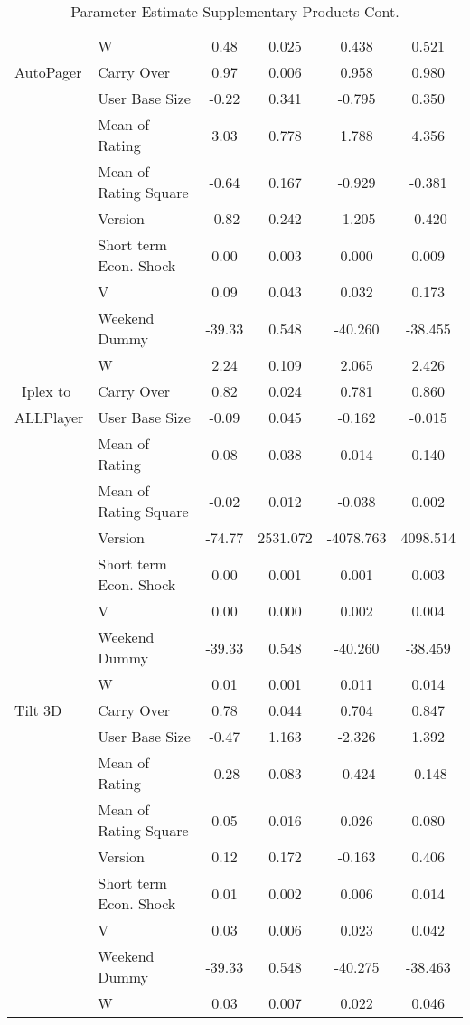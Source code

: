 \documentclass[mksc,nonblindrev]{informs3}
\begin{document}
\begin{table}
\begin{tabular}{llcccc}
	&	W	&	0.48	&	0.025	&	0.438	&	0.521	\\
AutoPager	&	Carry Over	&	0.97	&	0.006	&	0.958	&	0.980	\\
	&	User Base Size	&	-0.22	&	0.341	&	-0.795	&	0.350	\\
	&	Mean of Rating	&	3.03	&	0.778	&	1.788	&	4.356	\\
	&	Mean of Rating Square	&	-0.64	&	0.167	&	-0.929	&	-0.381	\\
	&	Version	&	-0.82	&	0.242	&	-1.205	&	-0.420	\\
	&	Short term Econ. Shock	&	0.00	&	0.003	&	0.000	&	0.009	\\
	&	V	&	0.09	&	0.043	&	0.032	&	0.173	\\
	&	Weekend Dummy	&	-39.33	&	0.548	&	-40.260	&	-38.455	\\
	&	W	&	2.24	&	0.109	&	2.065	&	2.426	\\
 Iplex to	&	Carry Over	&	0.82	&	0.024	&	0.781	&	0.860	\\
 ALLPlayer	&	User Base Size	&	-0.09	&	0.045	&	-0.162	&	-0.015	\\
	&	Mean of Rating	&	0.08	&	0.038	&	0.014	&	0.140	\\
	&	Mean of Rating Square	&	-0.02	&	0.012	&	-0.038	&	0.002	\\
	&	Version	&	-74.77	&	2531.072	&	-4078.763	&	4098.514	\\
	&	Short term Econ. Shock	&	0.00	&	0.001	&	0.001	&	0.003	\\
	&	V	&	0.00	&	0.000	&	0.002	&	0.004	\\
	&	Weekend Dummy	&	-39.33	&	0.548	&	-40.260	&	-38.459	\\
	&	W	&	0.01	&	0.001	&	0.011	&	0.014	\\
Tilt 3D	&	Carry Over	&	0.78	&	0.044	&	0.704	&	0.847	\\
	&	User Base Size	&	-0.47	&	1.163	&	-2.326	&	1.392	\\
	&	Mean of Rating	&	-0.28	&	0.083	&	-0.424	&	-0.148	\\
	&	Mean of Rating Square	&	0.05	&	0.016	&	0.026	&	0.080	\\
	&	Version	&	0.12	&	0.172	&	-0.163	&	0.406	\\
	&	Short term Econ. Shock	&	0.01	&	0.002	&	0.006	&	0.014	\\
	&	V	&	0.03	&	0.006	&	0.023	&	0.042	\\
	&	Weekend Dummy	&	-39.33	&	0.548	&	-40.275	&	-38.463	\\
	&	W	&	0.03	&	0.007	&	0.022	&	0.046	\\

		\end{tabular}
	\caption{Parameter Estimate Supplementary Products Cont.}
	\label{tab:ParameterEstimateSupplementaryProducts}
\end{table}
\end{document}
